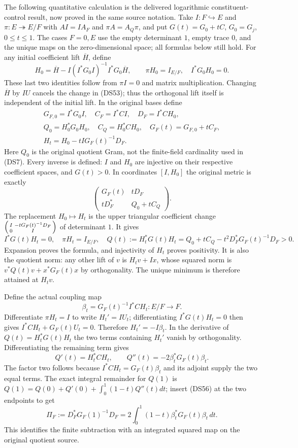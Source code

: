 The following quantitative calculation is the delivered logarithmic
constituent-control result, now proved in the same source notation.
Take $I:F\hookrightarrow E$ and $\pi:E\twoheadrightarrow E/F$
with $AI=IA_F$ and $\pi A=A_Q\pi$, and put
$G(t)=G_0+tC$, $G_0=G_j$, $0\leq t\leq1$.
The cases $F=0,E$ use the empty determinant $1$, empty trace $0$,
and the unique maps on the zero-dimensional space; all formulas
below still hold.  For any initial coefficient lift $\overline H$,
define
\[
 H_0=\overline H-I(I^*G_0I)^{-1}I^*G_0\overline H,
 \qquad \pi H_0=I_{E/F},\quad I^*G_0H_0=0.
 \tag{DS53}
\]
These last two identities follow from $\pi I=0$ and matrix
multiplication.  Changing $\overline H$ by $IU$ cancels the change
in (DS53); thus the orthogonal lift itself is independent of the
initial lift.  In the original bases define
\[
\begin{gathered}
 G_{F,0}=I^*G_0I,\quad C_F=I^*CI,\quad D_F=I^*CH_0,\\
 Q_0=H_0^*G_0H_0,\quad C_Q=H_0^*CH_0,
 \quad G_F(t)=G_{F,0}+tC_F,\\
 H_t=H_0-tIG_F(t)^{-1}D_F.
\end{gathered}\tag{DS54}
\]
Here $Q_0$ is the original quotient Gram, not the finite-field
cardinality used in (DS7).  Every inverse is defined: $I$ and $H_0$
are injective on their respective coefficient spaces, and $G(t)>0$.
In coordinates $[I,H_0]$ the original metric is exactly
\[
 \begin{pmatrix}G_F(t)&tD_F\\tD_F^*&Q_0+tC_Q\end{pmatrix}.
 \tag{DS55}
\]
The replacement $H_0\mapsto H_t$ is the upper triangular
coefficient change
$\begin{psmallmatrix}I&-tG_F(t)^{-1}D_F\\0&I\end{psmallmatrix}$
of determinant $1$.  It gives
\[
 I^*G(t)H_t=0,\quad \pi H_t=I_{E/F},\quad
 Q(t):=H_t^*G(t)H_t
 =Q_0+tC_Q-t^2D_F^*G_F(t)^{-1}D_F>0.
 \tag{DS56}
\]
Expansion proves the formula, and injectivity of $H_t$ proves
positivity.  It is also the quotient norm: any other lift of $v$
is $H_tv+Ix$, whose squared norm is
$v^*Q(t)v+x^*G_F(t)x$ by orthogonality.  The unique minimum is
therefore attained at $H_tv$.

Define the actual coupling map
\[
 \beta_t=G_F(t)^{-1}I^*CH_t:E/F\to F.
 \tag{DS57}
\]
Differentiate $\pi H_t=I$ to write $H_t'=IU_t$; differentiating
$I^*G(t)H_t=0$ then gives
$I^*CH_t+G_F(t)U_t=0$.  Therefore $H_t'=-I\beta_t$.
In the derivative of $Q(t)=H_t^*G(t)H_t$ the two terms containing
$H_t'$ vanish by orthogonality.  Differentiating the remaining term
gives
\[
 Q'(t)=H_t^*CH_t,\qquad
 Q''(t)=-2\beta_t^*G_F(t)\beta_t.
 \tag{DS58}
\]
The factor two follows because
$I^*CH_t=G_F(t)\beta_t$ and its adjoint supply the two equal
terms.  The exact integral remainder for $Q(1)$ is
$Q(1)=Q(0)+Q'(0)+\int_0^1(1-t)Q''(t)dt$; insert (DS56) at the
two endpoints to get
\[
 \Pi_F:=D_F^*G_F(1)^{-1}D_F
 =2\int_0^1(1-t)\beta_t^*G_F(t)\beta_t\,dt.
 \tag{DS59}
\]
This identifies the finite subtraction with an integrated squared
map on the original quotient source.

